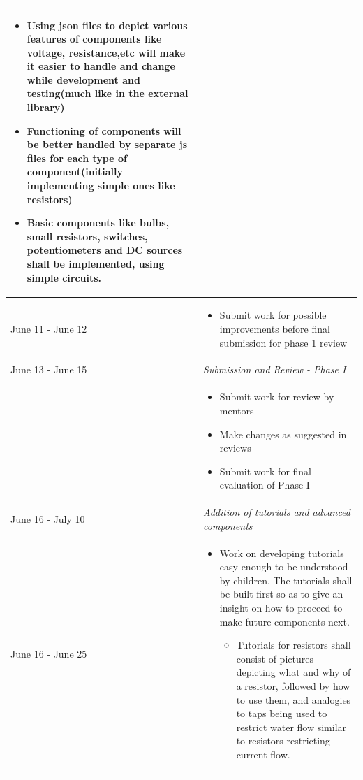 \documentclass[preprint,12pt]{elsarticle}
\begin{document}
\begin{center}
\begin{tabularx}{\linewidth}{|l|X|}
{\begin{itemize}[noitemsep, topsep=2pt]
	\begin{itemize}[noitemsep, topsep=2pt]
		\item Using json files to depict various features of components like voltage, resistance,etc will make it easier to handle and change while development and testing(much like in the external library)
		
		\item Functioning of components will be better handled by separate js files for each type of component(initially implementing simple ones like resistors)
		
		\item Basic components like bulbs, small resistors, switches, potentiometers and DC sources shall be implemented, using simple circuits.
	\end{itemize}
\end{itemize}
}\\
\hline

{June 11 - June 12} & \par
\parbox{12cm}{
\begin{itemize}[noitemsep, topsep=2pt]
	\item Submit work for possible improvements before final submission for phase 1 review
\end{itemize}
}\\
\hline\hline

{June 13 - June 15} & {\textit{Submission and Review - Phase I
}}\\
\hline

 & \par
\parbox{12cm}{
\begin{itemize}[noitemsep, topsep=2pt]
	\item Submit work for review by mentors
	\item Make changes as suggested in reviews
	\item Submit work for final evaluation of Phase I
\end{itemize}
}\\
\hline\hline

{June 16 - July 10} & {\textit{Addition of tutorials and advanced components
}}\\
\hline

{June 16 - June 25} & \par
\parbox{12cm}{
\begin{itemize}[noitemsep, topsep=2pt]
	\item Work on developing tutorials easy enough to be understood by children. The tutorials shall be built first so as to give an insight on how to proceed to make future components next.
	\begin{itemize}[noitemsep, topsep=2pt]
		\item Tutorials for resistors shall consist of pictures depicting what and why of a resistor, followed by how to use them, and analogies to taps being used to restrict water flow similar to resistors restricting current flow.
	\end{itemize}
\end{itemize}
}\\
\hline


\end{tabularx}
\end{center}
\end{document}
